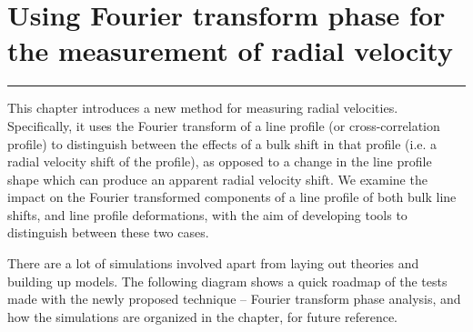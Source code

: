 \chapter{Using Fourier transform phase for the measurement of radial velocity}
\label{\thechapter}
\label{ch:Methods}


\rule{\textwidth}{1.6pt}
\minitoc
\clearpage



\label{\thesection}

This chapter introduces a new method for measuring radial velocities. Specifically, it uses the Fourier transform
of a line profile (or cross-correlation profile) to distinguish between the effects of a bulk shift in that profile (i.e. a radial velocity shift of the profile), as opposed to a change in the line profile shape which can produce an apparent radial velocity shift. We examine the impact on the Fourier transformed components of a line profile of both bulk line shifts, and line profile deformations, with the aim of developing tools to distinguish between these two cases.

There are a lot of simulations involved apart from laying out theories and building up models. The following diagram shows a quick roadmap of the tests made with the newly proposed technique -- Fourier transform phase analysis, and how the simulations are organized in the chapter, for future reference.
 

